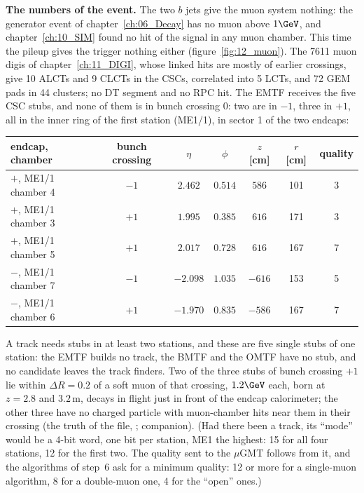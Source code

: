 \textbf{The numbers of the event.} The two $b$ jets give the muon system nothing: the generator event of
chapter~\ref{ch:06_Decay} has no muon above $1\GeV$, and chapter~\ref{ch:10_SIM} found no hit of the signal in any
muon chamber. This time the pileup gives the trigger nothing either (figure~\ref{fig:12_muon}). The 7611 muon digis of
chapter~\ref{ch:11_DIGI}, whose linked hits are mostly of earlier crossings, give 10 ALCTs and 9 CLCTs in the CSCs,
correlated into 5 LCTs, and 72 GEM pads in 44 clusters; no DT segment and no RPC hit. The EMTF receives the five CSC
stubs, and none of them is in bunch crossing 0: two are in $-1$, three in $+1$, all in the inner ring of the first
station (ME1/1), in sector 1 of the two endcaps:

\begin{center}\small
\begin{tabular}{lcccccc}
\toprule
endcap, chamber & bunch crossing & $\eta$ & $\phi$ & $z$ [cm] & $r$ [cm] & quality \\
\midrule
$+$, ME1/1 chamber 4 & $-1$ & $2.462$ & $0.514$ & $586$ & 101 & 3 \\
$+$, ME1/1 chamber 3 & $+1$ & $1.995$ & $0.385$ & $616$ & 171 & 3 \\
$+$, ME1/1 chamber 5 & $+1$ & $2.017$ & $0.728$ & $616$ & 167 & 7 \\
$-$, ME1/1 chamber 7 & $-1$ & $-2.098$ & $1.035$ & $-616$ & 153 & 5 \\
$-$, ME1/1 chamber 6 & $+1$ & $-1.970$ & $0.835$ & $-586$ & 167 & 7 \\
\bottomrule
\end{tabular}
\end{center}

\noindent A track needs stubs in at least two stations, and these are five single stubs of one station: the EMTF
builds no track, the BMTF and the OMTF have no stub, and no candidate leaves the track finders. Two of the three stubs
of bunch crossing $+1$ lie within $\Delta R=0.2$ of a soft muon of that crossing, $1.2\GeV$ each, born at $z=2.8$ and
$3.2$\,m, decays in flight just in front of the endcap calorimeter; the other three have no charged particle with
muon-chamber hits near them in their crossing (the truth of the file, ; companion). (Had
there been a track, its ``mode'' would be a 4-bit word, one bit per station, ME1 the highest: 15 for all four
stations, 12 for the first two. The quality sent to the $\mu$GMT follows from it, and the algorithms of step~6 ask for
a minimum quality: 12 or more for a single-muon algorithm, 8 for a double-muon one, 4 for the ``open'' ones.)

